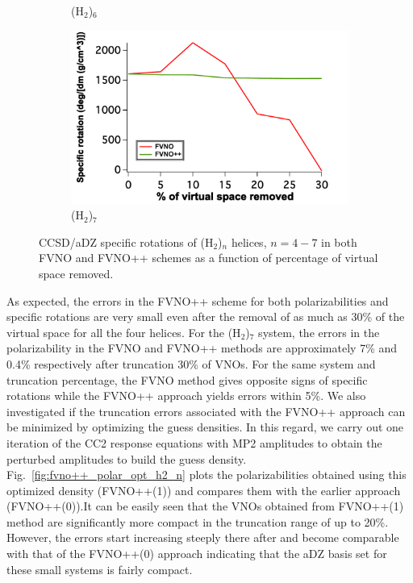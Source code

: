 \begin{figure}
\begin{subfigure}{.5\textwidth}
  \caption{(H$_2$)$_6$}
  \label{fig:sfig3}
\end{subfigure}%
\begin{subfigure}{.5\textwidth}
  \centering
  \includegraphics[width=.9\linewidth]{figures_fvno++/fvno++_h2_7_adz_optrot_lg.pdf}
  \caption{(H$_2$)$_7$}
  \label{fig:sfig4}
\end{subfigure}
\caption{{\footnotesize CCSD/aDZ  specific rotations of
(H$_2$)$_n$ helices, $ n = 4-7$ in both FVNO and FVNO++ schemes as a function of
percentage of virtual space removed.}}
\label{fig:fvno++_optrot_h2_n}
\end{figure}
As expected, the errors in the FVNO++ scheme for both polarizabilities and specific rotations are very small even after the removal of as much as 30\% of the virtual space for all the four helices. For the (H$_2$)$_7$ system, the errors in the polarizability in the FVNO and FVNO++ methods are approximately 7\% and 0.4\% respectively after truncation 30\% of VNOs. For the same system and truncation percentage, the FVNO method gives opposite signs of specific rotations while the FVNO++ approach yields errors within 5\%. We also investigated if the truncation errors associated with the FVNO++ approach can be minimized by optimizing the guess densities. In this regard, we carry out one iteration of the CC2 response equations with MP2 amplitudes to obtain the perturbed amplitudes to build the guess density. Fig.~\ref{fig:fvno++_polar_opt_h2_n} plots the polarizabilities obtained using this optimized density (FVNO++(1)) and compares them with the earlier approach (FVNO++(0)).It can be easily seen that the VNOs obtained from FVNO++(1) method are significantly more compact in the truncation range of up to 20\%. However, the errors start increasing steeply there after and become comparable with that of the FVNO++(0) approach indicating that the aDZ basis set for these small systems is fairly compact. 
